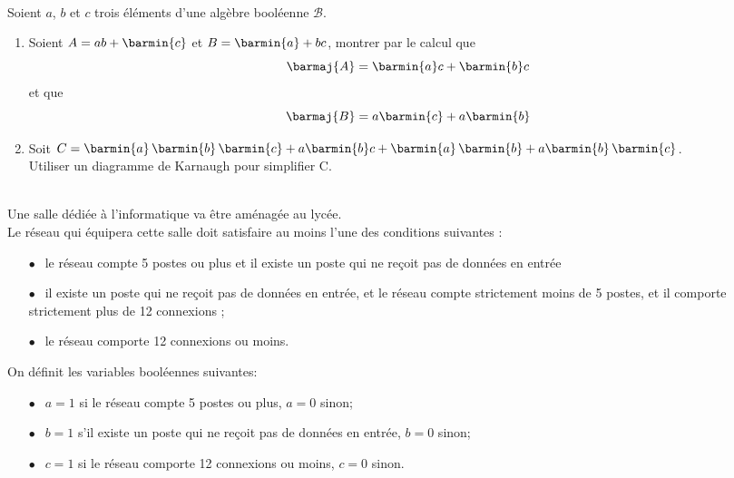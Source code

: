 \documentclass[a4paper,12pt]{article}
\begin{document}

\exo{}\\

Soient $a$, $b$ et $c$ trois éléments d'une algèbre booléenne $\mathscr{B}$.

\begin{enumerate}[\bfseries 1.]
	\item 	Soient $A=ab+\barmin{c}$ et $B=\barmin{a}+bc$, montrer par le calcul que $$\barmaj{A}=\barmin{a}c+\barmin{b}c$$ et que $$\barmaj{B}=a\barmin{c}+a\barmin{b}$$
	\item 	Soit $C=\barmin{a}\,\barmin{b}\,\barmin{c}+a\barmin{b}c+\barmin{a}\,\barmin{b}+a\barmin{b}\,\barmin{c}$.\\
			Utiliser un diagramme de Karnaugh pour simplifier C.\\
\end{enumerate}

\\

Une salle dédiée à l'informatique va être aménagée au lycée.\\
Le réseau qui équipera cette salle doit satisfaire au moins l'une des conditions suivantes :

\setlength\parindent{9mm}
\begin{itemize}
	\item[$\bullet~~$] le réseau compte 5 postes ou plus et il existe un poste qui ne reçoit pas de données en entrée
	\item[$\bullet~~$] il existe un poste qui ne reçoit pas de données en entrée, et le réseau compte strictement moins  de 5 postes, et il comporte strictement plus de 12 connexions ;
	\item[$\bullet~~$] le réseau comporte 12 connexions ou moins.
\end{itemize}
\setlength\parindent{0mm}

\smallskip

On définit les variables booléennes suivantes:

\setlength\parindent{9mm}
\begin{enumerate}
	\item[$\bullet~~$] $a = 1$ si le réseau compte 5 postes ou plus, $a = 0$ sinon;
	\item[$\bullet~~$] $b = 1$ s'il existe un poste qui ne reçoit pas de données en entrée, $b = 0$ sinon;
	\item[$\bullet~~$] $c = 1$ si le réseau comporte 12 connexions ou moins, $c = 0$ sinon.
\end{enumerate}
\setlength\parindent{0mm}
\end{document}

